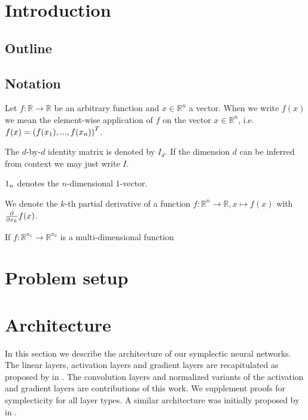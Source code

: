 \documentclass[twoside,a4paper]{article}
\begin{document}
\section{Introduction}


\subsection{Outline}

\subsection{Notation}

Let $f: \mathbb{R} \rightarrow \mathbb{R}$ be an arbitrary function and $x \in \mathbb{R}^n$
a vector. When we write $f(x)$ we mean the element-wise application of $f$ 
on the vector $x \in \mathbb{R}^n$, i.e. $f(x) = \left(
	f(x_1), ..., f(x_n)
\right)^T$.

The $d$-by-$d$ identity matrix is denoted by $I_d$. If the dimension $d$ can be inferred
from context we may just write $I$.

$1_{n}$ denotes the $n$-dimensional $1$-vector.


We denote the $k$-th partial derivative of a function $f: \mathbb{R}^n \to \mathbb{R},
x \mapsto f(x)$ with $\frac{\partial }{\partial x_k} f(x)$.

If $f: \mathbb{R}^{n_1} \to \mathbb{R}^{n_2}$ is a multi-dimensional function




%
%
\newpage
\section{Problem setup}

\section{Architecture}

In this section we describe the architecture of our symplectic neural networks.
The linear layers, activation layers and gradient layers are recapitulated as 
proposed by \citeauthor{Jin2020} in \cite{Jin2020}.
The convolution layers and normalized variants of the activation and gradient layers
are contributions of this work. 
We supplement proofs for symplecticity for all layer types. 
A similar architecture was initially proposed by \citeauthor{Deco1995} in \cite{Deco1995} 
.
\end{document}
